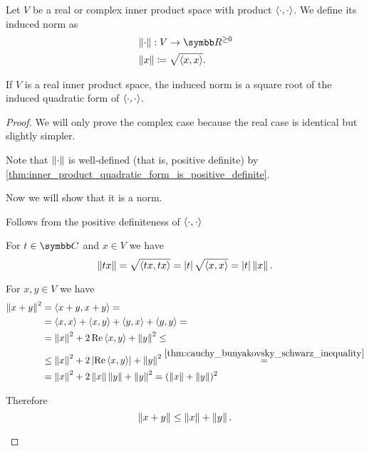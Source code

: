 \begin{definition}\label{def:bilinear_form_induced_norm}
  Let \( V \) be a real or complex inner product space with product \( \left\langle \cdot, \cdot \right\rangle \). We define its induced norm as
  \begin{align*}
    &\Norm \cdot : V \to \R^{\geq 0} \\
    &\Norm x \coloneqq \sqrt{\Prod x x}.
  \end{align*}

  If \( V \) is a real inner product space, the induced norm is a square root of the induced quadratic form of \( \left\langle \cdot, \cdot \right\rangle \).
\end{definition}
\begin{proof}
  We will only prove the complex case because the real case is identical but slightly simpler.

  Note that \( \left\Vert \cdot \right\Vert \) is well-defined (that is, positive definite) by \cref{thm:inner_product_quadratic_form_is_positive_definite}.

  Now we will show that it is a norm.
  \begin{description}
     Follows from the positive definiteness of \( \left\langle \cdot, \cdot \right\rangle \)

     For \( t \in \Co \) and \( x \in V \) we have
    \begin{equation*}
      \left\Vert tx \right\Vert = \sqrt{\left\langle tx, tx \right\rangle} = \left\vert t \right\vert \sqrt{\left\langle x, x \right\rangle} = \left\vert t \right\vert \left\Vert x \right\Vert.
    \end{equation*}

     For \( x, y \in V \) we have
    \begin{align*}
      \left\Vert x + y \right\Vert^2
      &=
      \left\langle x + y, x + y \right\rangle
      = \\ &=
      \left\langle x, x \right\rangle + \left\langle x, y \right\rangle + \left\langle y, x \right\rangle + \left\langle y, y \right\rangle
      = \\ &=
      \left\Vert x \right\Vert^2 + 2 \operatorname{Re} \left\langle x, y \right\rangle + \left\Vert y \right\Vert^2
      \leq \\ &\leq
      \left\Vert x \right\Vert^2 + 2 \left\vert \operatorname{Re} \left\langle x, y \right\rangle \right\vert + \left\Vert y \right\Vert^2
      \overset {\ref{thm:cauchy_bunyakovsky_schwarz_inequality}} = \\ &=
      \left\Vert x \right\Vert^2 + 2 \left\Vert x \right\Vert \left\Vert y \right\Vert + \left\Vert y \right\Vert^2
      =
      (\left\Vert x \right\Vert + \left\Vert y \right\Vert)^2
    \end{align*}

    Therefore
    \begin{equation*}
      \left\Vert x + y \right\Vert \leq \left\Vert x \right\Vert + \left\Vert y \right\Vert.
    \end{equation*}
  \end{description}
\end{proof}
